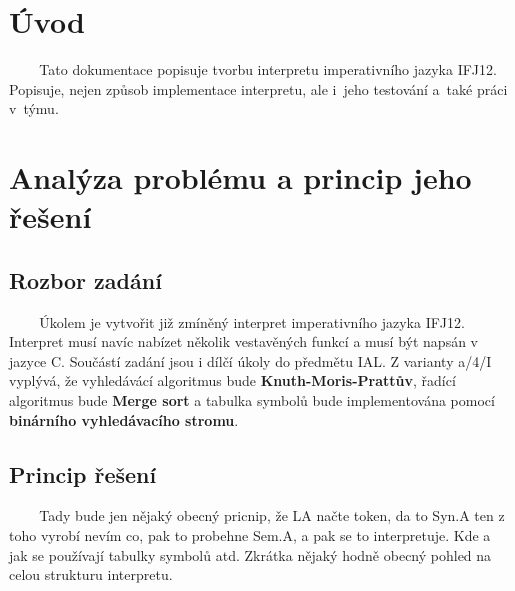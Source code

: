 \documentclass[12pt,a4paper,titlepage,final]{article}
\begin{document}



\pagestyle{plain}
\setcounter{page}{1}
\tableofcontents

\newpage
\pagestyle{plain}
\setcounter{page}{1}

\section{Úvod} \label{uvod}
~ ~ ~Tato dokumentace popisuje tvorbu interpretu imperativního jazyka IFJ12. 
Popisuje, nejen způsob implementace interpretu, ale i~jeho testování a~také práci v~týmu.

\section{Analýza problému a princip jeho řešení} \label{analyza}
\subsection{Rozbor zadání}
~ ~ ~Úkolem je vytvořit již zmíněný interpret imperativního jazyka IFJ12. Interpret 
musí navíc nabízet několik vestavěných funkcí a musí být napsán v jazyce C. Součástí 
zadání jsou i dílčí úkoly do předmětu IAL. Z varianty a/4/I vyplývá, že vyhledávácí 
algoritmus bude \textbf{Knuth-Moris-Prattův}, řadící algoritmus bude \textbf{Merge sort} 
a tabulka symbolů bude implementována pomocí \textbf{binárního vyhledávacího stromu}. 
\subsection{Princip řešení}
~ ~ ~Tady bude jen nějaký obecný pricnip, že LA načte token, da to Syn.A ten z toho vyrobí 
nevím co, pak to probehne Sem.A, a pak se to interpretuje. Kde a jak se používají tabulky
symbolů atd. Zkrátka nějaký hodně obecný pohled na celou strukturu interpretu. 
\end{document}
